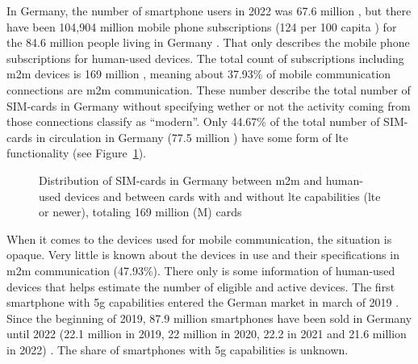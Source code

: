 \documentclass[11pt,a4paper]{article}
\begin{document}
In Germany, the number of smartphone users in 2022 was 67.6 million \citep{smartphonenutzerDeutschland}, but there have been 104,904 million mobile phone subscriptions (124 per 100 capita \citep{mobilesubscriptionsDeutschland}) for the 84.6 million people living in Germany \citep{consensusDE2022}.
That only describes the mobile phone subscriptions for human-used devices.
The total count of subscriptions including \acrshort{m2m} devices is 169 million \citep{totalmobilesubscriptionsDeutschland}, meaning about 37.93\% of mobile communication connections are \acrshort{m2m} communication.
These number describe the total number of SIM-cards in Germany without specifying wether or not the activity coming from those connections classify as \enquote{modern}.
Only 44.67\% of the total number of SIM-cards in circulation in Germany (77.5 million \citep{simCardsDeutschland}) have some form of \acrshort{lte} functionality (see Figure~\ref{fig:simdistribution}).

\begin{figure}[t]


  \caption{Distribution of SIM-cards in Germany between \acrlong*{m2m} and human-used devices and between cards with and without \acrshort{lte} capabilities (\acrshort{lte} or newer), totaling 169 million (M) cards}
  \label{fig:simdistribution}
\end{figure}

When it comes to the devices used for mobile communication, the situation is opaque.
Very little is known about the devices in use and their specifications in \acrshort{m2m} communication (47.93\%).
There only is some information of human-used devices that helps estimate the number of eligible and active devices.
The first smartphone with \acrshort{5g} capabilities entered the German market in march of 2019 \citep{smartphonemodells5G}.
Since the beginning of 2019, 87.9 million smartphones have been sold in Germany until 2022 (22.1 million in 2019, 22 million in 2020, 22.2 in 2021 and 21.6 million in 2022) \citep{smartphonenutzungDeutschland}.
The share of smartphones with \acrshort{5g} capabilities is unknown.
\end{document}
